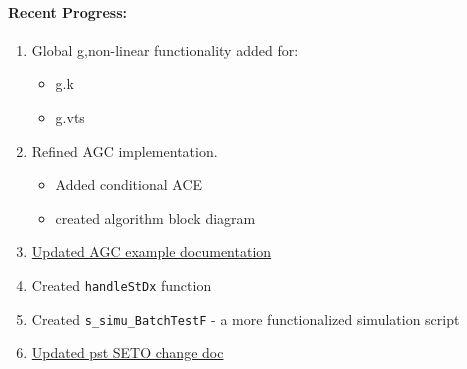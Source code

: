 \documentclass[12pt]{article}
\begin{document}
\begin{multicols}{2}
\raggedright

\paragraph{Recent Progress:}
	\begin{enumerate}
		\itemsep0em 
		\item Global g,non-linear functionality added for: %
		\begin{minipage}{\linewidth}
		\begin{multicols}{2}
				\begin{itemize}
		\itemsep0em 
				\footnotesize
				\raggedright
					\item g.k
					\item g.vts
				\end{itemize}
		\end{multicols}
		\end{minipage}
		
		\item Refined AGC implementation.
				\begin{minipage}{\linewidth}
								\begin{itemize}
						\itemsep0em 
								\footnotesize
						\item Added conditional ACE
						\item created algorithm block diagram
									
								\end{itemize}
						\end{minipage}
		\item \href{https://github.com/thadhaines/MT-Tech-SETO/blob/master/researchDocs/TEX/one-offs/200720-PSTandAGC/200720-PSTandAGC.pdf}
				{Updated AGC example documentation}
\item Created \verb|handleStDx| function
\item Created \verb|s_simu_BatchTestF| - a more functionalized	simulation script
	\item \href{https://github.com/thadhaines/MT-Tech-SETO/blob/master/researchDocs/TEX/one-offs/200709-PSTsetoVersionChanges/200709-PSTsetoVersionChanges.pdf}
		{Updated pst SETO change doc}
		

\end{enumerate}
\end{multicols}
\end{document}
